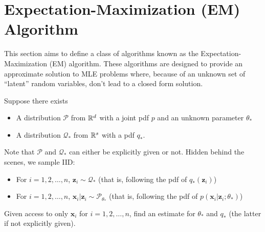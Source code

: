 \section{Expectation-Maximization (EM) Algorithm}
This section aims to define a class of algorithms known as the Expectation-Maximization (EM) algorithm. These algorithms are designed to provide an approximate solution to MLE problems where, because of an unknown set of ``latent'' random variables, don't lead to a closed form solution.
\begin{definition}
    Suppose there exists 
    \begin{itemize}
        \item A distribution $\mathcal{P}$ from $\mathbb{R}^d$ with a joint pdf $p$ and an unknown parameter $\theta_*$
        \item A distribution $\mathcal{Q}_*$ from $\mathbb{R}^s$ with a pdf $q_*$.
    \end{itemize}
    Note that $\mathcal{P}$ and $\mathcal{Q}_*$ can either be explicitly given or not. Hidden behind the scenes, we sample IID:
    \begin{itemize}
        \item For $i=1,2,\dots,n$, $\mathbf{z}_i\sim\mathcal{Q}_*$ (that is, following the pdf of $q_*(\mathbf{z}_i)$)
        \item For $i=1,2,\dots,n$, $\mathbf{x}_i|\mathbf{z}_i\sim\mathcal{P}_{\theta_*}$ (that is, following the pdf of $p(\mathbf{x}_i|\mathbf{z}_i;\theta_*)$)
    \end{itemize}
    Given access to only $\mathbf{x}_i$ for $i=1,2,\dots,n$, find an estimate for $\theta_*$ and $q_*$ (the latter if not explicitly given).
\end{definition}

